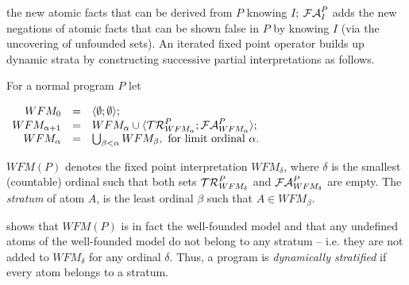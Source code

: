 the new atomic facts that can be derived from $P$ knowing $I$; $\calfalse^P_I$
adds the new negations of atomic facts that can be shown false in $P$
by knowing $I$ (via the uncovering of unfounded sets).  An iterated
fixed point operator builds up dynamic strata by constructing
successive partial interpretations as follows.
\begin{definition}
\label{def:IFP}
For a normal program $P$ let 

\begin{center}
$  \begin{array}{rcl}
          WFM_0 & = & \langle \emptyset ; \emptyset \rangle;      \\
 WFM_{\alpha+1} & = &       WFM_{\alpha} \cup
                                \langle \kcaltrue^P_{WFM_\alpha};\calfalse^P_{WFM_\alpha} \rangle; \\
     WFM_\alpha & = & \bigcup_{\beta < \alpha} WFM_\beta, \mbox{ for limit ordinal }\alpha.
  \end{array}
$
\end{center}

\noindent
  $WFM(P)$ denotes the fixed point interpretation $WFM_\delta$,
  where $\delta$ is the smallest (countable) ordinal such that both
  sets $\mathcal{TR}^P_{WFM_\delta}$ and $\calfalse^P_{WFM_\delta}$ are empty.
The {\em stratum} of atom $A$, is the least ordinal $\beta$ such that
   $A \in WFM_{\beta}$.
\end{definition}
%
\cite{Przy89d} shows that %
$WFM(P)$ is in fact the well-founded model and that any undefined
atoms of the well-founded model do not belong to any stratum --
i.e. they are not added to $WFM_{\delta}$ for any ordinal
$\delta$. Thus, a program is \emph{dynamically stratified} if every
atom belongs to a stratum.


%

